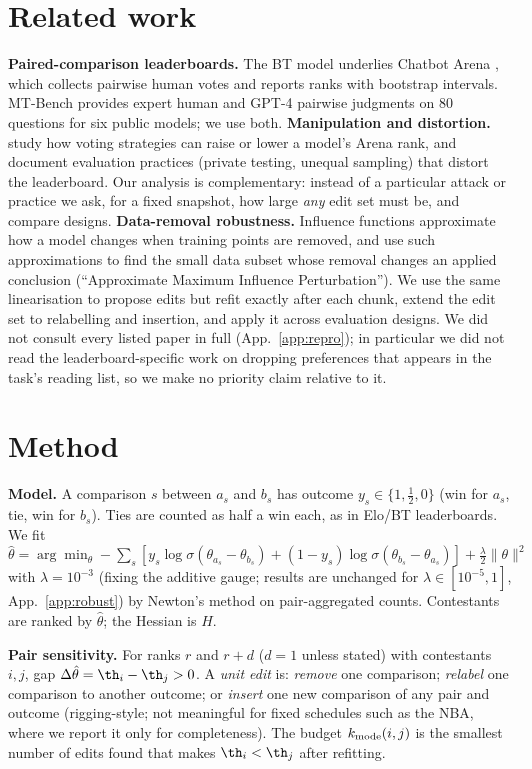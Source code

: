 \documentclass{article}
\newcommand{\thh}{\hat\theta}
\begin{document}
\section{Related work}
\textbf{Paired-comparison leaderboards.} The BT model \citep{bradley1952} underlies Chatbot Arena \citep{chiang2024}, which collects pairwise human votes and reports ranks with bootstrap intervals. MT-Bench \citep{zheng2023} provides expert human and GPT-4 pairwise judgments on 80 questions for six public models; we use both. \textbf{Manipulation and distortion.} \citet{min2025} study how voting strategies can raise or lower a model's Arena rank, and \citet{singh2025} document evaluation practices (private testing, unequal sampling) that distort the leaderboard. Our analysis is complementary: instead of a particular attack or practice we ask, for a fixed snapshot, how large \emph{any} edit set must be, and compare designs. \textbf{Data-removal robustness.} Influence functions \citep{koh2017} approximate how a model changes when training points are removed, and \citet{broderick2020} use such approximations to find the small data subset whose removal changes an applied conclusion (``Approximate Maximum Influence Perturbation''). We use the same linearisation to propose edits but refit exactly after each chunk, extend the edit set to relabelling and insertion, and apply it across evaluation designs. We did not consult every listed paper in full (App.~\ref{app:repro}); in particular we did not read the leaderboard-specific work on dropping preferences that appears in the task's reading list, so we make no priority claim relative to it.

\section{Method}\label{sec:method}
\textbf{Model.} A comparison $s$ between $a_s$ and $b_s$ has outcome $y_s\in\{1,\tfrac12,0\}$ (win for $a_s$, tie, win for $b_s$). Ties are counted as half a win each, as in Elo/BT leaderboards. We fit
$\thh=\arg\min_\theta -\sum_s [y_s\log\sigma(\theta_{a_s}-\theta_{b_s})+(1-y_s)\log\sigma(\theta_{b_s}-\theta_{a_s})]+\tfrac{\lambda}{2}\|\theta\|^2$ with $\lambda=10^{-3}$ (fixing the additive gauge; results are unchanged for $\lambda\in[10^{-5},1]$, App.~\ref{app:robust}) by Newton's method on pair-aggregated counts. Contestants are ranked by $\thh$; the Hessian is $H$.

\textbf{Pair sensitivity.} For ranks $r$ and $r{+}d$ ($d=1$ unless stated) with contestants $i,j$, gap $\Delta\thh=\th_i-\th_j>0$. A \emph{unit edit} is: \emph{remove} one comparison; \emph{relabel} one comparison to another outcome; or \emph{insert} one new comparison of any pair and outcome (rigging-style; not meaningful for fixed schedules such as the NBA, where we report it only for completeness). The budget $k_{\rm mode}(i,j)$ is the smallest number of edits found that makes $\th_i<\th_j$ after refitting.
\end{document}
